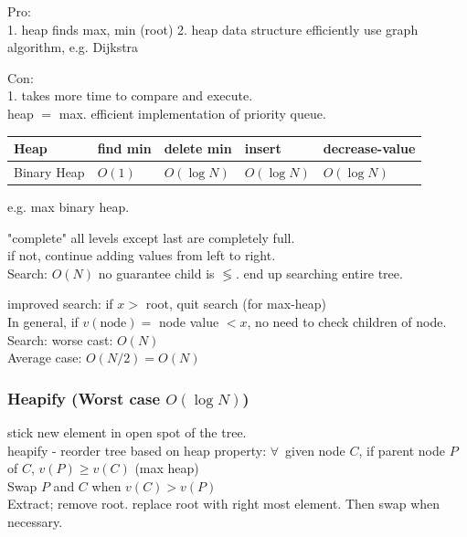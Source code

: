 \documentclass[10pt]{amsart}
\begin{document}
Pro: \\ 
1. heap finds max, min (root)
2. heap data structure efficiently use graph algorithm, e.g. Dijkstra

Con: \\
1. takes more time to compare and execute. \\
heap $ = $ max. efficient implementation of priority queue. 

\begin{center}
	\begin{tabular}{ l | l | l | l | l  }
		\hline
		Heap & find min & delete min & insert & decrease-value \\ \hline
		Binary Heap & $O(1)$ & $O(\log{N})$ & $O(\log{N})$ & $O(\log{N})$ \\ \hline 
		\hline
	\end{tabular}
\end{center}

e.g. max binary heap.

"complete" all levels except last are completely full. \\
if not, continue adding values from left to right. \\

Search: $O(N)$ no guarantee child is $\lessgtr$. end up searching entire tree.

improved search: if $x >$ root, quit search (for max-heap) \\
In general, if $v(\text{node}) =$ node value $< x$, no need to check children of node. \\

Search: worse cast: $O(N)$ \\
\phantom{Search} Average case: $O(N/2) = O(N)$ \\

\subsubsection{Heapify (Worst case $O(\log{N})$)} 

stick new element in open spot of the tree. \\
heapify - reorder tree based on heap property: $\forall \, $ given node $C$, if parent node $P$ of $C$, $v(P) \geq v(C)$ (max heap) \\

Swap $P$ and $C$ when $v(C) > v(P)$ \\
Extract; remove root. replace root with right most element. Then swap when necessary. \\
\end{document}
